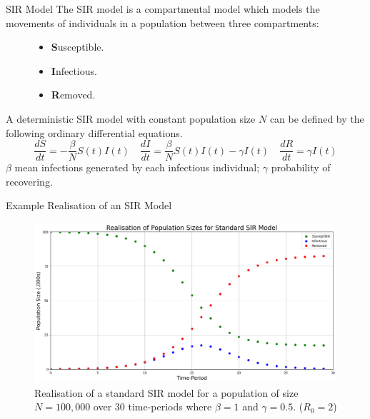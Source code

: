 \documentclass[aspectratio=169]{beamer}
\begin{document}
\begin{frame}{SIR Model}
  The SIR model is a compartmental model which models the movements of individuals in a population between three compartments:

  \begin{figure}[!htb]
    \centering
    \begin{minipage}{.3\textwidth}
        \centering
        \begin{itemize}
          \item \textbf{S}usceptible.
          \item \textbf{I}nfectious.
          \item \textbf{R}emoved.
        \end{itemize}
    \end{minipage}%
    \begin{minipage}{.7\textwidth}
        \centering
    \end{minipage}
  \end{figure}

  A deterministic SIR model with constant population size $N$ can be defined by the following ordinary differential equations.
  \[ \frac{dS}{dt}=-\frac\beta{N} S(t)I(t)\quad\frac{dI}{dt}=\frac\beta{N} S(t)I(t)-\gamma I(t)\quad\frac{dR}{dt}=\gamma I(t) \]
  $\beta$ mean infections generated by each infectious individual; $\gamma$ probability of recovering.
\end{frame}

\begin{frame}{Example Realisation of an SIR Model}
  \begin{figure}[H]
    \centering\includegraphics[width=.75\textwidth]{example_sir_model.png}
    \caption{Realisation of a standard SIR model for a population of size $N=100,000$ over 30 time-periods where $\beta=1$ and $\gamma=0.5$. ($R_0=2$)}
    \label{fig_sir_example}
  \end{figure}
\end{frame}
\end{document}
